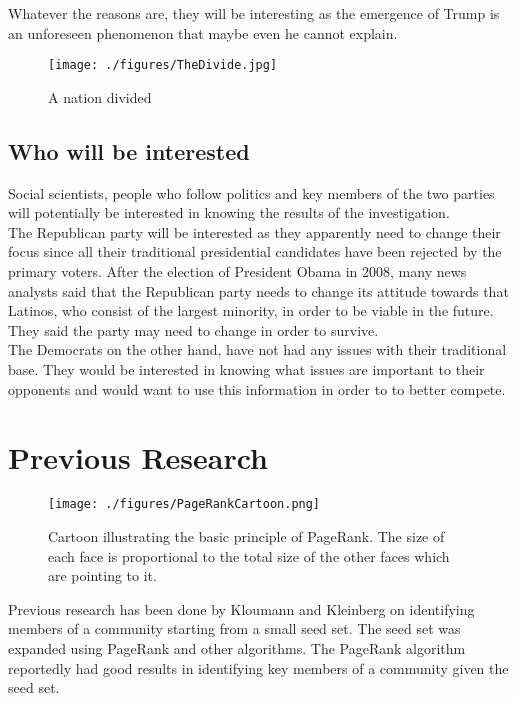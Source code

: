 \documentclass{sig-alternate-05-2015}
\begin{document}
Whatever the reasons are, they will be interesting as the emergence of Trump is an unforeseen phenomenon that maybe even he cannot explain.

\begin{figure}[!t]
\centering
\texttt{[image: ./figures/TheDivide.jpg]}
\caption{A nation divided}
\label{TheDivide}
\end{figure}

\subsection{Who will be interested}
Social scientists, people who follow politics and key members of the two parties will potentially be interested in knowing the results of the investigation. \\

The Republican party will be interested as they apparently need to change their focus since all their traditional presidential candidates have been rejected by the primary voters. After the election of President Obama in 2008, many news analysts said that the Republican party needs to change its attitude towards that Latinos, who consist of the largest minority, in order to be viable in the future. They said the party may need to change in order to survive.  \\

The Democrats on the other hand, have not had any issues with their traditional base. They would be interested in knowing what issues are important to their opponents and would want to use this information in order to to better compete.

\section{Previous Research}

\begin{figure}[!t]
\centering
\texttt{[image: ./figures/PageRankCartoon.png]}
\caption{Cartoon illustrating the basic principle of PageRank\cite{PageRankCartoonWiki}. The size of each face is proportional to the total size of the other faces which are pointing to it.}
\label{PageRankCartoon}
\end{figure}

Previous research has been done by Kloumann and Kleinberg \cite{SeedSet} on identifying members of a community starting from a small seed set. The seed set was expanded using PageRank and other algorithms. The PageRank algorithm reportedly had good results in identifying key members of a community given the seed set.\\
\end{document}

